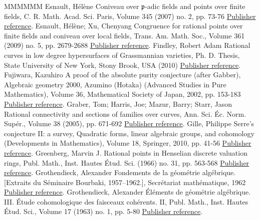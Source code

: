 \begin{thebibliography}{MMMMMM}
 Esnault, Hélène Coniveau over \(\mathfrak{p}\)-adic fields and points over finite fields, C. R. Math. Acad. Sci. Paris, Volume 345 (2007) no. 2, pp. 73-76 \href{https://ahl.centre-mersenne.org/item/AHL_2020__3__1399_0/#Esnaultpadic}{Publisher reference}.
 Esnault, Hélène; Xu, Chenyang Congruence for rational points over finite fields and coniveau over local fields, Trans. Am. Math. Soc., Volume 361 (2009) no. 5, pp. 2679-2688 \href{https://ahl.centre-mersenne.org/item/AHL_2020__3__1399_0/#EsnaultXu}{Publisher reference}.
 Findley, Robert Adam Rational curves in low degree hypersurfaces of Grassmannian varieties, Ph. D. Thesis, State University of New York, Stony Brook, USA (2010) \href{https://ahl.centre-mersenne.org/item/AHL_2020__3__1399_0/#Findley}{Publisher reference}.
 Fujiwara, Kazuhiro A proof of the absolute purity conjecture (after Gabber), Algebraic geometry 2000, Azumino (Hotaka) (Advanced Studies in Pure Mathematics), Volume 36, Mathematical Society of Japan, 2002, pp. 153-183 \href{https://ahl.centre-mersenne.org/item/AHL_2020__3__1399_0/#Fujiwara}{Publisher reference}.
 Graber, Tom; Harris, Joe; Mazur, Barry; Starr, Jason Rational connectivity and sections of families over curves, Ann. Sci. Éc. Norm. Supér., Volume 38 (2005), pp. 671-692 \href{https://ahl.centre-mersenne.org/item/AHL_2020__3__1399_0/#GHMS}{Publisher reference}.
 Gille, Philippe Serre’s conjecture II: a survey, Quadratic forms, linear algebraic groups, and cohomology (Developments in Mathematics), Volume 18, Springer, 2010, pp. 41-56 \href{https://ahl.centre-mersenne.org/item/AHL_2020__3__1399_0/#GilleSII}{Publisher reference}.
 Greenberg, Marvin J. Rational points in Henselian discrete valuation rings, Publ. Math., Inst. Hautes Étud. Sci. (1966) no. 31, pp. 563-568 \href{https://ahl.centre-mersenne.org/item/AHL_2020__3__1399_0/#Greenberg84}{Publisher reference}.
 Grothendieck, Alexander Fondements de la géométrie algébrique. [Extraits du Séminaire Bourbaki, 1957–1962.], Secrétariat mathématique, 1962 \href{https://ahl.centre-mersenne.org/item/AHL_2020__3__1399_0/#FGA}{Publisher reference}.
 Grothendieck, Alexander Éléments de géométrie algébrique. III. Étude cohomologique des faisceaux cohérents. II, Publ. Math., Inst. Hautes Étud. Sci., Volume 17 (1963) no. 1, pp. 5-80 \href{https://ahl.centre-mersenne.org/item/AHL_2020__3__1399_0/#EGA3}{Publisher reference}.

\end{thebibliography}
